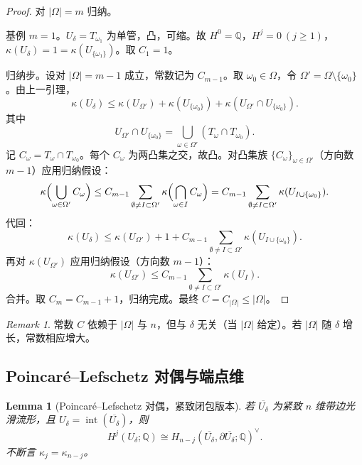 \documentclass[11pt,a4paper]{article}
\newtheorem{lemma}[theorem]{Lemma}
\theoremstyle{remark}
\newtheorem{remark}[theorem]{Remark}
\begin{document}
	\begin{proof}
		对 $|\Omega|=m$ 归纳。
		
		基例 $m=1$。$U_\delta=T_{\omega_1}$ 为单管，凸，可缩。故 $H^0=\mathbb Q$，$H^j=0\ (j\ge1)$，$\kappa(U_\delta)=1=\kappa(U_{\{\omega_1\}})$。取 $C_1=1$。
		
		归纳步。设对 $|\Omega|=m-1$ 成立，常数记为 $C_{m-1}$。取 $\omega_0\in\Omega$，令 $\Omega'=\Omega\setminus\{\omega_0\}$。由上一引理，
		\[
		\kappa(U_\delta)\le\kappa(U_{\Omega'})+\kappa(U_{\{\omega_0\}})+\kappa(U_{\Omega'}\cap U_{\{\omega_0\}}).
		\]
		其中
		\[
		U_{\Omega'}\cap U_{\{\omega_0\}}=\bigcup_{\omega\in\Omega'}(T_\omega\cap T_{\omega_0}).
		\]
		记 $C_\omega=T_\omega\cap T_{\omega_0}$。每个 $C_\omega$ 为两凸集之交，故凸。对凸集族 $\{C_\omega\}_{\omega\in\Omega'}$（方向数 $m-1$）应用归纳假设：
		\[
		\kappa\Bigl(\bigcup_{\omega\in\Omega'}C_\omega\Bigr)
		\le C_{m-1}\sum_{\emptyset\neq I\subset\Omega'}\kappa\Bigl(\bigcap_{\omega\in I}C_\omega\Bigr)
		=C_{m-1}\sum_{\emptyset\neq I\subset\Omega'}\kappa(U_{I\cup\{\omega_0\}}).
		\]
		代回：
		\[
		\kappa(U_\delta)\le\kappa(U_{\Omega'})+1+C_{m-1}\sum_{\emptyset\neq I\subset\Omega'}\kappa(U_{I\cup\{\omega_0\}}).
		\]
		再对 $\kappa(U_{\Omega'})$ 应用归纳假设（方向数 $m-1$）：
		\[
		\kappa(U_{\Omega'})\le C_{m-1}\sum_{\emptyset\neq I\subset\Omega'}\kappa(U_I).
		\]
		合并。取 $C_m=C_{m-1}+1$，归纳完成。最终 $C=C_{|\Omega|}\le|\Omega|$。
	\end{proof}
	
	\begin{remark}
		常数 $C$ 依赖于 $|\Omega|$ 与 $n$，但与 $\delta$ 无关（当 $|\Omega|$ 给定）。若 $|\Omega|$ 随 $\delta$ 增长，常数相应增大。
	\end{remark}
	
	\subsection{Poincaré--Lefschetz 对偶与端点维}
	\begin{lemma}[Poincaré--Lefschetz 对偶，紧致闭包版本]
		\label{lem:poincare-lefschetz}
		若 $\overline{U_\delta}$ 为紧致 $n$ 维带边光滑流形，且 $U_\delta=\operatorname{int}(\overline{U_\delta})$，则
		\[
		H^j(U_\delta;\mathbb Q)\cong H_{n-j}(\overline{U_\delta},\partial\overline{U_\delta};\mathbb Q)^\vee.
		\]
		不断言 $\kappa_j=\kappa_{n-j}$。
	\end{lemma}
	
\end{document}
